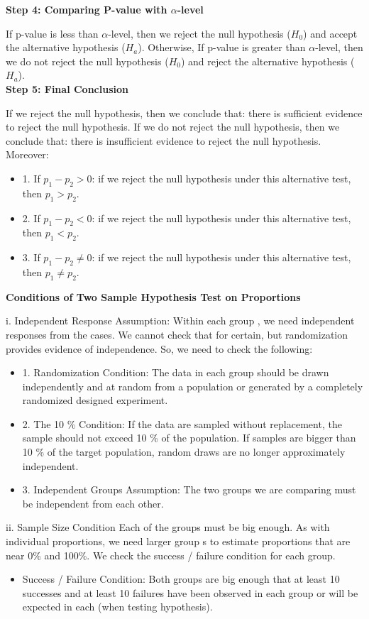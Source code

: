 \textbf{Step 4: Comparing P-value with $\alpha$-level}

If p-value is less than $\alpha$-level, then we reject the null hypothesis ($H_0$) and accept the alternative hypothesis ($H_a$). Otherwise, If p-value is greater than $\alpha$-level, then we do not reject the null hypothesis ($H_0$) and reject the alternative hypothesis ($H_a$).\\

\textbf{Step 5: Final Conclusion}

If we reject the null hypothesis, then we conclude that: there is sufficient evidence to reject the null hypothesis. If we do not reject the null hypothesis, then we conclude that: there is insufficient evidence to reject the null hypothesis. Moreover: 

\begin{itemize}
	\item 1. If $p_1 - p_2 > 0$: if we reject the null hypothesis under this alternative test, then $p_1 > p_2$.
	\item 2. If $p_1- p_2 < 0$: if we reject the null hypothesis under this alternative test, then $p_1 < p_2$.
	\item 3. If $p_1 - p_2 \neq 0$: if we reject the null hypothesis under this alternative test, then $p_1 \neq p_2$.
\end{itemize}

\textbf{Conditions of Two Sample Hypothesis Test on Proportions}

i. Independent Response Assumption:
Within each group , we need independent responses from the cases. We cannot check that for certain, but randomization provides evidence of independence. So, we need to check the following:
\begin{itemize}
	\item 1. Randomization Condition: The data in each group should be drawn independently and at random from a population or generated by a completely randomized designed experiment.
	\item 2. The 10 \% Condition: If the data are sampled without replacement, the sample should not exceed 10 \% of the population. If samples are bigger than 10 \% of the target population, random draws are no longer approximately independent.
	\item 3. Independent Groups Assumption: The two groups we are comparing must be independent from each other.
\end{itemize}

ii. Sample Size Condition Each of the groups must be big enough. As with individual proportions, we need larger group s to estimate proportions that are near 0\% and 100\%. We check the success / failure condition for each group.
\begin{itemize}
	\item Success / Failure Condition: Both groups are big enough that at least 10 successes and at least 10 failures have been observed in each group or will be expected in each (when testing hypothesis).
\end{itemize}

